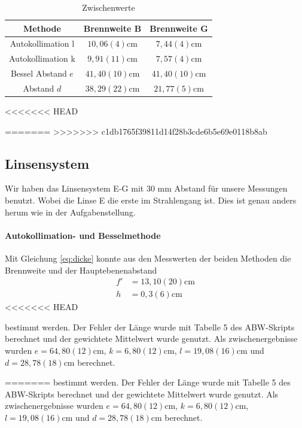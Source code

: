 \documentclass[11pt, a4paper]{article}
\begin{document}
    \begin{table}[h]
        \centering
        \begin{tabular}{c|c|c}
            Methode & Brennweite B & Brennweite G \\ \hline
            Autokollimation l & $10,06(4) \si{\centi\metre}$ & $7,44(4) \si{\centi\metre}$ \\ \hline
            Autokollimation k & $9,91(11) \si{\centi\metre}$ & $7,57(4) \si{\centi\metre}$ \\ \hline
            Bessel Abstand $e$ & $41,40(10) \si{\centi\metre}$ & $41,40(10) \si{\centi\metre}$ \\ \hline
            Abstand $d$ & $38,29(22) \si{\centi\metre}$ & $21,77(5) \si{\centi\metre}$
        \end{tabular}
        \caption{Zwischenwerte }
        \label{tab:zwischen}
    \end{table}

<<<<<<< HEAD

=======
>>>>>>> c1db1765f39811d14f28b3cde6b5e69e0118b8ab
    \subsection{Linsensystem}
    Wir haben das Linsensystem E-G mit $30$ mm Abstand für unsere Messungen benutzt. Wobei die Linse E die erste im Strahlengang ist. Dies ist genau anders herum wie in der Aufgabenstellung.

    \paragraph{Autokollimation- und Besselmethode}
    Mit Gleichung \ref{eq:dicke} konnte aus den Messwerten der beiden Methoden die Brennweite und der Hauptebenenabstand
    \begin{align}
        f' &= 13,10(20) \si{\centi\metre} \\
        h &= 0,3(6) \si{\centi\metre}
    \end{align}
<<<<<<< HEAD

    bestimmt werden. Der Fehler der Länge wurde mit Tabelle 5 des ABW-Skripts \cite{ABW} berechnet und der gewichtete Mittelwert wurde genutzt. Als zwischenergebnisse wurden $e = 64,80(12) \si{\centi\metre}$, $k = 6,80(12) \si{\centi\metre}$, $l = 19,08(16) \si{\centi\metre}$ und $d = 28,78(18) \si{\centi\metre}$ berechnet.


=======
    bestimmt werden. Der Fehler der Länge wurde mit Tabelle 5 des ABW-Skripts \cite{ABW} berechnet und der gewichtete Mittelwert wurde genutzt. Als zwischenergebnisse wurden $e = 64,80(12) \si{\centi\metre}$, $k = 6,80(12) \si{\centi\metre}$, $l = 19,08(16) \si{\centi\metre}$ und $d = 28,78(18) \si{\centi\metre}$ berechnet.
\end{document}
